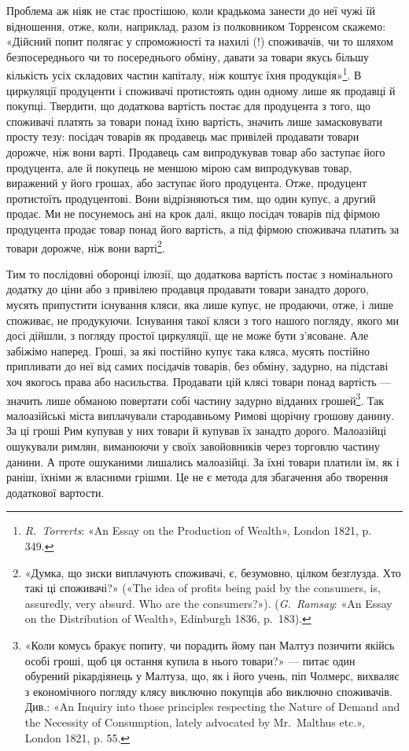Проблема аж ніяк не стає простішою, коли крадькома занести
до неї чужі їй відношення, отже, коли, наприклад, разом із полковником
Торренсом скажемо: «Дійсний попит полягає у спроможності
та нахилі (!) споживачів, чи то шляхом безпосереднього
чи то посереднього обміну, давати за товари якусь більшу
кількість усіх складових частин капіталу, ніж коштує їхня продукція»\footnote{
\emph{R.~Torrerts}: «An Essay on the Production of Wealth», London
1821, p. 349.
}.
В циркуляції продуценти і споживачі протистоять
один одному лише як продавці й покупці. Твердити, що додаткова
вартість постає для продуцента з того, що споживачі платять
за товари понад їхню вартість, значить лише замасковувати
просту тезу: посідач товарів як продавець має привілей продавати
товари дорожче, ніж вони варті. Продавець сам випродукував
товар або заступає його продуцента, але й покупець не меншою
мірою сам випродукував товар, виражений у його грошах,
або заступає його продуцента. Отже, продуцент протистоїть
продуцентові. Вони відрізняються тим, що один купує, а другий
продає. Ми не посунемось ані на крок далі, якщо посідач товарів
під фірмою продуцента продає товар понад його вартість, а під
фірмою споживача платить за товари дорожче, ніж вони варті\footnote{
«Думка, що зиски виплачують споживачі, є, безумовно, цілком
безглузда. Хто такі ці споживачі?» («The idea of profits being paid by
the consumers, is, assuredly, very absurd. Who are the consumers?»).
(\emph{G.~Ramsay}: «An Essay on the Distribution of Wealth», Edinburgh 1836, p.~183).
}.

Тим то послідовні оборонці ілюзії, що додаткова вартість
постає з номінального додатку до ціни або з привілею продавця
продавати товари занадто дорого, мусять припустити існування
кляси, яка лише купує, не продаючи, отже, і лише споживає,
не продукуючи. Існування такої кляси з того нашого погляду,
якого ми досі дійшли, з погляду простої циркуляції, ще не може
бути з’ясоване. Але забіжімо наперед. Гроші, за які постійно
купує така кляса, мусять постійно припливати до неї від самих
посідачів товарів, без обміну, задурно, на підставі хоч якогось
права або насильства. Продавати цій клясі товари понад вартість
— значить лише обманою повертати собі частину задурно
відданих грошей\footnote{
«Коли комусь бракує попиту, чи порадить йому пан Малтуз позичити
якійсь особі гроші, щоб ця остання купила в нього товари?» — питає
один обурений рікардіянець у Малтуза, що, як і його учень, піп Чолмерс,
вихваляє з економічного погляду клясу виключно покупців або виключно
споживачів. Див.: «An Inquiry into those principles respecting the Nature
of Demand and the Necessity of Consumption, lately advocated by Mr.~Malthus
etc.», London 1821, p. 55.
}. Так малоазійські міста виплачували стародавньому
Римові щорічну грошову данину. За ці гроші Рим купував
у них товари й купував їх занадто дорого. Малоазійці ошукували
римлян, виманюючи у своїх завойовників через торговлю
частину данини. А проте ошуканими лишались малоазійці. За
їхні товари платили їм, як і раніш, їхніми ж власними грішми.
Це не є метода для збагачення або творення додаткової вартости.

